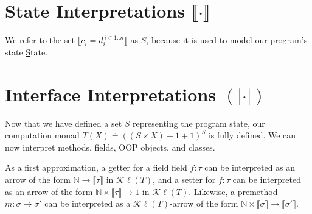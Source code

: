 \documentclass{article}
\newcommand{\mbf}{\mathbf}
\newcommand{\sem}[1]{\llbracket #1 \rrbracket}
\newcommand{\csem}[1]{( \! | #1 | \! )}
\begin{document}
\section{State Interpretations $\sem{\cdot}$}




We refer to the set $\sem{c_i = d_i^{~i \in 1..n}}$ as $S$, because it is used to model our program's state 
\underline{S}tate.


\section{Interface Interpretations $\csem{\cdot}$}

Now that we have defined a set $S$ representing the program state, our computation monad
$T(X) \doteq ((S \times X) + 1 + 1)^S$ is fully defined.
We can now interpret methods, fields, OOP objects, and classes.

As a first approximation, a getter for a field field $f : \tau$ can be interpreted as an arrow of the form 
$\mathbb N \to \sem{\tau}$ in $\mathcal K \ell(T)$, and a setter for $f : \tau$ can be interpreted as an arrow
of the form $\mathbb N \times \sem{\tau} \to 1$ in $\mathcal K \ell(T)$. Likewise, a premethod 
$m : \sigma \to \sigma'$ can be interpreted as a $\mathcal K \ell(T)$-arrow of the form $\mathbb N \times \sem{\sigma} \to \sem{\sigma'}$.
\end{document}
